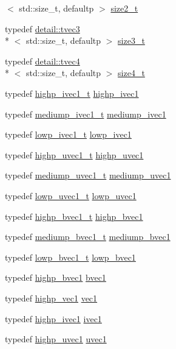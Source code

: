 \begin{DoxyCompactItemize}
$<$ std\-::size\-\_\-t, defaultp $>$ \hyperlink{group__gtx__std__based__type_ga64be170f9203528ff59efa40b1977bb0}{size2\-\_\-t}
\item 
typedef \hyperlink{structglm_1_1detail_1_1tvec3}{detail\-::tvec3}\\*
$<$ std\-::size\-\_\-t, defaultp $>$ \hyperlink{group__gtx__std__based__type_gad9ddaab6dd4c37ba46b74a1423ef2ba3}{size3\-\_\-t}
\item 
typedef \hyperlink{structglm_1_1detail_1_1tvec4}{detail\-::tvec4}\\*
$<$ std\-::size\-\_\-t, defaultp $>$ \hyperlink{group__gtx__std__based__type_gaaaf9b6a73135945e356601a01beece30}{size4\-\_\-t}
\item 
typedef \hyperlink{structglm_1_1detail_1_1tvec1}{highp\-\_\-ivec1\-\_\-t} \hyperlink{namespaceglm_addb6724b01f125e2730aeaad6130b06f}{highp\-\_\-ivec1}
\item 
typedef \hyperlink{structglm_1_1detail_1_1tvec1}{mediump\-\_\-ivec1\-\_\-t} \hyperlink{namespaceglm_a7efcceaaa791c2380d1b17bd7baa45ee}{mediump\-\_\-ivec1}
\item 
typedef \hyperlink{structglm_1_1detail_1_1tvec1}{lowp\-\_\-ivec1\-\_\-t} \hyperlink{namespaceglm_a5d781b915bec50a9d5b5383835035533}{lowp\-\_\-ivec1}
\item 
typedef \hyperlink{structglm_1_1detail_1_1tvec1}{highp\-\_\-uvec1\-\_\-t} \hyperlink{namespaceglm_a2a480125ab05aa522d883651ea1101f8}{highp\-\_\-uvec1}
\item 
typedef \hyperlink{structglm_1_1detail_1_1tvec1}{mediump\-\_\-uvec1\-\_\-t} \hyperlink{namespaceglm_a1fa5a5fb993ee72b4dc8d2a9caf85b26}{mediump\-\_\-uvec1}
\item 
typedef \hyperlink{structglm_1_1detail_1_1tvec1}{lowp\-\_\-uvec1\-\_\-t} \hyperlink{namespaceglm_ad50d8a6d477675ffc627f0949f1d5615}{lowp\-\_\-uvec1}
\item 
typedef \hyperlink{structglm_1_1detail_1_1tvec1}{highp\-\_\-bvec1\-\_\-t} \hyperlink{namespaceglm_ad24a2ac97dbfbece48f504224bb20b59}{highp\-\_\-bvec1}
\item 
typedef \hyperlink{structglm_1_1detail_1_1tvec1}{mediump\-\_\-bvec1\-\_\-t} \hyperlink{namespaceglm_a6c2cab6a7010331621a5ce656dd5f58d}{mediump\-\_\-bvec1}
\item 
typedef \hyperlink{structglm_1_1detail_1_1tvec1}{lowp\-\_\-bvec1\-\_\-t} \hyperlink{namespaceglm_af22d6a46a35bcda63801fe78c033f35f}{lowp\-\_\-bvec1}
\item 
typedef \hyperlink{namespaceglm_ad24a2ac97dbfbece48f504224bb20b59}{highp\-\_\-bvec1} \hyperlink{namespaceglm_a30260c045e085bb8d19eddca772cac61}{bvec1}
\item 
typedef \hyperlink{group__gtc__type__precision_gab3f08c031846e7a95b49e81c48d920d3}{highp\-\_\-vec1} \hyperlink{namespaceglm_a16030dae9029ed1eab1553a2183bbb79}{vec1}
\item 
typedef \hyperlink{namespaceglm_addb6724b01f125e2730aeaad6130b06f}{highp\-\_\-ivec1} \hyperlink{namespaceglm_a946031cea0c22745848ebd873e6facb0}{ivec1}
\item 
typedef \hyperlink{namespaceglm_a2a480125ab05aa522d883651ea1101f8}{highp\-\_\-uvec1} \hyperlink{namespaceglm_a4e12bc23a3d060164eef452f81d92a03}{uvec1}
\end{DoxyCompactItemize}
